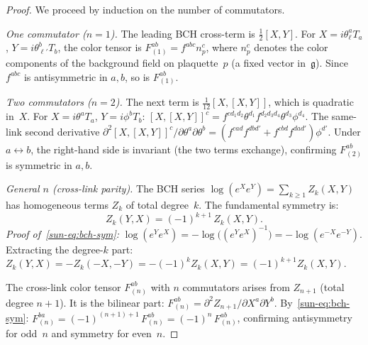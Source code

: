 \documentclass[11pt]{article}
\theoremstyle{definition}
\newcommand{\fg}{\mathfrak{g}}
\begin{document}
\begin{proof}
We proceed by induction on the number of commutators.

\emph{One commutator ($n=1$).}
The leading BCH cross-term is $\frac{1}{2}[X,Y]$.  For
$X=i\theta_\ell^a T_a$, $Y=i\theta_{\ell'}^b T_b$, the
color tensor is $F^{ab}_{(1)}=f^{abc}n^c_p$, where
$n^c_p$ denotes the color components of the background
field on plaquette~$p$ (a fixed vector in~$\fg$).
Since $f^{abc}$ is antisymmetric in $a,b$, so is
$F^{ab}_{(1)}$.

\emph{Two commutators ($n=2$).}
The next term is $\frac{1}{12}[X,[X,Y]]$,
which is quadratic in~$X$.  For
$X=i\theta^a T_a$, $Y=i\phi^b T_b$:
$[X,[X,Y]]^c=f^{cd_1 d_2}\theta^{d_1}f^{d_2 d_3 d_4}
\theta^{d_3}\phi^{d_4}$.  The same-link second derivative
$\partial^2[X,[X,Y]]^c/\partial\theta^a\partial\theta^b
=(f^{cad}f^{dbd'}+f^{cbd}f^{dad'})\phi^{d'}$.
Under $a\leftrightarrow b$, the right-hand side is
invariant (the two terms exchange), confirming
$F^{ab}_{(2)}$ is symmetric in $a,b$.

\emph{General $n$ (cross-link parity).}
The BCH series $\log(e^X e^Y)=\sum_{k\ge 1}Z_k(X,Y)$
has homogeneous terms $Z_k$ of total degree~$k$.
The fundamental symmetry is:
\begin{equation}\label{sun-eq:bch-sym}
Z_k(Y,X)=(-1)^{k+1}\,Z_k(X,Y).
\end{equation}
\emph{Proof of~\eqref{sun-eq:bch-sym}:}
$\log(e^Y e^X)=-\log\bigl((e^Y e^X)^{-1}\bigr)
=-\log(e^{-X}e^{-Y})$.
Extracting the degree-$k$ part:
$Z_k(Y,X)=-Z_k(-X,-Y)=-(-1)^k Z_k(X,Y)
=(-1)^{k+1}Z_k(X,Y)$.

The cross-link color tensor $F^{ab}_{(n)}$ with
$n$ commutators arises from $Z_{n+1}$
(total degree $n+1$).  It is the bilinear part:
$F^{ab}_{(n)}
=\partial^2 Z_{n+1}/\partial X^a\partial Y^b$.
By~\eqref{sun-eq:bch-sym}:
$F^{ba}_{(n)}=(-1)^{(n+1)+1}\,F^{ab}_{(n)}
=(-1)^n\,F^{ab}_{(n)}$,
confirming antisymmetry for odd~$n$ and symmetry
for even~$n$.
\end{proof}


\label{sun-sec:christoffel}
\end{document}
